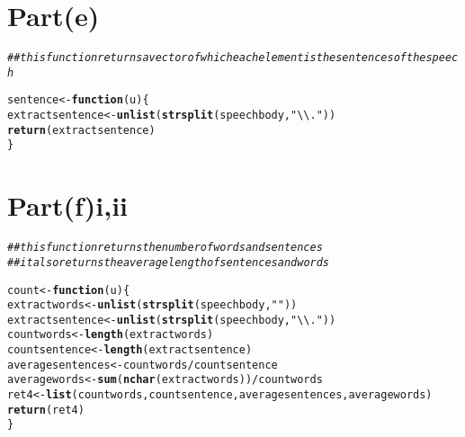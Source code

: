 \documentclass[english]{article}\usepackage[]{graphicx}\usepackage[]{color}
\makeatletter
\newcommand{\hlstr}[1]{\textcolor[rgb]{0.192,0.494,0.8}{#1}}%
\newcommand{\hlcom}[1]{\textcolor[rgb]{0.678,0.584,0.686}{\textit{#1}}}%
\newcommand{\hlopt}[1]{\textcolor[rgb]{0,0,0}{#1}}%
\newcommand{\hlstd}[1]{\textcolor[rgb]{0.345,0.345,0.345}{#1}}%
\newcommand{\hlkwa}[1]{\textcolor[rgb]{0.161,0.373,0.58}{\textbf{#1}}}%
\newcommand{\hlkwb}[1]{\textcolor[rgb]{0.69,0.353,0.396}{#1}}%
\newcommand{\hlkwc}[1]{\textcolor[rgb]{0.333,0.667,0.333}{#1}}%
\newcommand{\hlkwd}[1]{\textcolor[rgb]{0.737,0.353,0.396}{\textbf{#1}}}%
\newenvironment{kframe}{%
 \def\at@end@of@kframe{}%
 \ifinner\ifhmode%
  \def\at@end@of@kframe{\end{minipage}}%
  \begin{minipage}{\columnwidth}%
 \fi\fi%
 \def\FrameCommand##1{\hskip\@totalleftmargin \hskip-\fboxsep
 \colorbox{shadecolor}{##1}\hskip-\fboxsep
     \hskip-\linewidth \hskip-\@totalleftmargin \hskip\columnwidth}%
 \MakeFramed {\advance\hsize-\width
   \@totalleftmargin\z@ \linewidth\hsize
   \@setminipage}}%
 {\par\unskip\endMakeFramed%
 \at@end@of@kframe}
\newenvironment{knitrout}{}{} %
\makeatother
\begin{document}
\section*{Part(e)}

\begin{knitrout}
\color{fgcolor}\begin{kframe}
\begin{alltt}
\hlcom{## this function returns a vector of which each element is the sentences of the speech}

\hlstd{sentence} \hlkwb{<-} \hlkwa{function}\hlstd{(}\hlkwc{u}\hlstd{)\{}
        \hlstd{extractsentence} \hlkwb{<-} \hlkwd{unlist}\hlstd{(}\hlkwd{strsplit}\hlstd{(speechbody,}\hlstr{"\textbackslash{}\textbackslash{}."}\hlstd{))}
        \hlkwd{return}\hlstd{(extractsentence)}
\hlstd{\}}
\end{alltt}
\end{kframe}
\end{knitrout}


\section*{Part(f)i,ii}

\begin{knitrout}
\color{fgcolor}\begin{kframe}
\begin{alltt}
\hlcom{## this function returns the number of words and sentences}
\hlcom{## it also returns the average length of sentences and words}

\hlstd{count} \hlkwb{<-} \hlkwa{function}\hlstd{(}\hlkwc{u}\hlstd{)\{}
        \hlstd{extractwords} \hlkwb{<-} \hlkwd{unlist}\hlstd{(}\hlkwd{strsplit}\hlstd{(speechbody,}\hlstr{" "}\hlstd{))}
        \hlstd{extractsentence} \hlkwb{<-} \hlkwd{unlist}\hlstd{(}\hlkwd{strsplit}\hlstd{(speechbody,}\hlstr{"\textbackslash{}\textbackslash{}."}\hlstd{))}
        \hlstd{countwords} \hlkwb{<-} \hlkwd{length}\hlstd{(extractwords)}
        \hlstd{countsentence} \hlkwb{<-} \hlkwd{length}\hlstd{(extractsentence)}
        \hlstd{averagesentences} \hlkwb{<-} \hlstd{countwords}\hlopt{/}\hlstd{countsentence}
        \hlstd{averagewords} \hlkwb{<-} \hlkwd{sum}\hlstd{(}\hlkwd{nchar}\hlstd{(extractwords))}\hlopt{/}\hlstd{countwords}
        \hlstd{ret4} \hlkwb{<-} \hlkwd{list}\hlstd{(countwords, countsentence, averagesentences, averagewords)}
        \hlkwd{return}\hlstd{(ret4)}
\hlstd{\}}
\end{alltt}
\end{kframe}
\end{knitrout}
\end{document}
